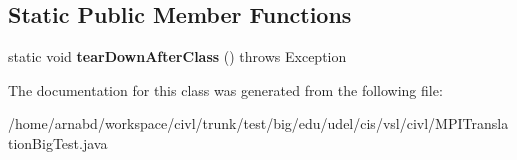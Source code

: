 \subsection*{Static Public Member Functions}
\begin{DoxyCompactItemize}
\item 
\hypertarget{classedu_1_1udel_1_1cis_1_1vsl_1_1civl_1_1MPITranslationBigTest_a43c4f127ebea4161e18e24337c63aafd}{}static void {\bfseries tear\+Down\+After\+Class} ()  throws Exception \label{classedu_1_1udel_1_1cis_1_1vsl_1_1civl_1_1MPITranslationBigTest_a43c4f127ebea4161e18e24337c63aafd}

\end{DoxyCompactItemize}


The documentation for this class was generated from the following file\+:\begin{DoxyCompactItemize}
\item 
/home/arnabd/workspace/civl/trunk/test/big/edu/udel/cis/vsl/civl/M\+P\+I\+Translation\+Big\+Test.\+java\end{DoxyCompactItemize}
